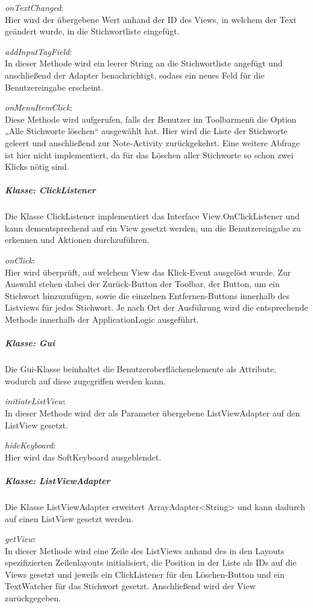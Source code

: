 \textit{onTextChanged}:\\
Hier wird der übergebene Wert anhand der ID des Views, in welchem der Text geändert wurde, in die Stichwortliste eingefügt.

\textit{addInputTagField}:\\
In dieser Methode wird ein leerer String an die Stichwortliste angefügt und anschließend der Adapter benachrichtigt, sodass ein neues Feld für die Benutzereingabe erscheint.

\textit{onMenuItemClick}:\\
Diese Methode wird aufgerufen, falls der Benutzer im Toolbarmenü die Option „Alle Stichworte löschen“ ausgewählt hat. Hier wird die Liste der Stichworte geleert und anschließend zur Note-Activity zurückgekehrt. Eine weitere Abfrage ist hier nicht implementiert, da für das Löschen aller Stichworte so schon zwei Klicks nötig sind.

\subparagraph{Klasse: ClickListener}
Die Klasse ClickListener implementiert das Interface View.OnClickListener und kann dementsprechend auf ein View gesetzt werden, um die Benutzereingabe zu erkennen und Aktionen durchzuführen.

\textit{onClick}:\\
Hier wird überprüft, auf welchem View das Klick-Event ausgelöst wurde. Zur Auswahl stehen dabei der Zurück-Button der Toolbar, der Button, um ein Stichwort hinzuzufügen, sowie die einzelnen Entfernen-Buttons innerhalb des Listviews für jedes Stichwort. Je nach Ort der Ausführung wird die entsprechende Methode innerhalb der ApplicationLogic ausgeführt.

\subparagraph{Klasse: Gui}
Die Gui-Klasse beinhaltet die Benutzeroberflächenelemente als Attribute, wodurch auf diese zugegriffen werden kann. 

\textit{initiateListView}:\\
In dieser Methode wird der als Parameter übergebene ListViewAdapter auf den ListView gesetzt.

\textit{hideKeyboard}:\\
Hier wird das SoftKeyboard ausgeblendet.

\subparagraph{Klasse: ListViewAdapter}
Die Klasse ListViewAdapter erweitert ArrayAdapter<String> und kann dadurch auf einen ListView gesetzt werden.

\textit{getView}:\\
In dieser Methode wird eine Zeile des ListViews anhand des in den Layouts spezifizierten Zeilenlayouts initialisiert, die Position in der Liste als IDs auf die Views gesetzt und jeweils ein ClickListener für den Löschen-Button und ein TextWatcher für das Stichwort gesetzt. Anschließend wird der View zurückgegeben.

